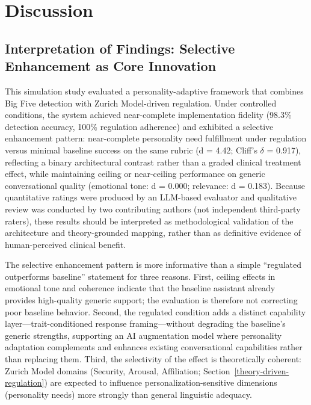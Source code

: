 \documentclass[apajournal,article,submit,moreauthors]{Definitions/mdpi}
\begin{document}
\section{Discussion}\label{discussion}

\subsection{Interpretation of Findings: Selective Enhancement as Core Innovation}\label{interpretation-of-findings-selective-enhancement-as-core-innovation}

This simulation study evaluated a personality-adaptive framework that combines Big Five detection with Zurich Model-driven regulation. Under controlled conditions, the system achieved near-complete implementation fidelity (98.3\% detection accuracy, 100\% regulation adherence) and exhibited a selective enhancement pattern: near-complete personality need fulfillment under regulation versus minimal baseline success on the same rubric (d = 4.42; Cliff's \(\delta\) = 0.917), reflecting a binary architectural contrast rather than a graded clinical treatment effect, while maintaining ceiling or near-ceiling performance on generic conversational quality (emotional tone: d = 0.000; relevance: d = 0.183). Because quantitative ratings were produced by an LLM-based evaluator and qualitative review was conducted by two contributing authors (not independent third-party raters), these results should be interpreted as methodological validation of the architecture and theory-grounded mapping, rather than as definitive evidence of human-perceived clinical benefit.

The selective enhancement pattern is more informative than a simple ``regulated outperforms baseline'' statement for three reasons. First, ceiling effects in emotional tone and coherence indicate that the baseline assistant already provides high-quality generic support; the evaluation is therefore not correcting poor baseline behavior. Second, the regulated condition adds a distinct capability layer---trait-conditioned response framing---without degrading the baseline's generic strengths, supporting an AI augmentation model where personality adaptation complements and enhances existing conversational capabilities rather than replacing them. Third, the selectivity of the effect is theoretically coherent: Zurich Model domains (Security, Arousal, Affiliation; Section~\ref{theory-driven-regulation}) are expected to influence personalization-sensitive dimensions (personality needs) more strongly than general linguistic adequacy.
\end{document}
